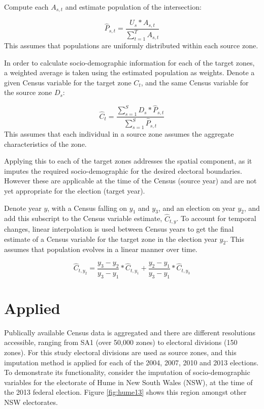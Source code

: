 \documentclass[openany]{book}
\begin{document}
Compute each \(A_{s,t}\) and estimate population of the intersection:

\[\hat{P}_{s,t} = \frac{U_s*A_{s,t}}{\sum_{t=1}^T A_{s,t}}\]
This assumes that populations are uniformly distributed within each source zone.

In order to calculate socio-demographic information for each of the target zones, a weighted average is taken using the estimated population as weights. Denote a given Census variable for the target zone \(C_t\), and the same Census variable for the source zone \(D_s\):

\[\hat{C}_t = \frac{\sum_{s=1}^{S}{D_s*\hat{P}_{s,t}}}{\sum_{s=1}^{S}{\hat{P}_{s,t}}}\]
This assumes that each individual in a source zone assumes the aggregate characteristics of the zone.

Applying this to each of the target zones addresses the spatial component, as it imputes the required socio-demographic for the desired electoral boundaries. However these are applicable at the time of the Census (source year) and are not yet appropriate for the election (target year).

Denote year \(y\), with a Census falling on \(y_1\) and \(y_3\), and an election on year \(y_2\), and add this subscript to the Census variable estimate, \(\hat{C}_{t,y}\). To account for temporal changes, linear interpolation is used between Census years to get the final estimate of a Census variable for the target zone in the election year \(y_2\). This assumes that population evolves in a linear manner over time.

\[\hat{C}_{t,y_2} = \frac{y_3-y_2}{y_3-y_1}*\hat{C}_{t,y_1} + \frac{y_2-y_1}{y_3-y_1}*\hat{C}_{t,y_3}\]

\hypertarget{applied}{%
\section{Applied}\label{applied}}

Publically available Census data is aggregated and there are different resolutions accessible, ranging from SA1 (over 50,000 zones) to electoral divisions (150 zones). For this study electoral divisions are used as source zones, and this imputation method is applied for each of the 2004, 2007, 2010 and 2013 elections. To demonstrate its functionality, consider the imputation of socio-demographic variables for the electorate of Hume in New South Wales (NSW), at the time of the 2013 federal election. Figure \ref{fig:hume13} shows this region amongst other NSW electorates.
\end{document}
